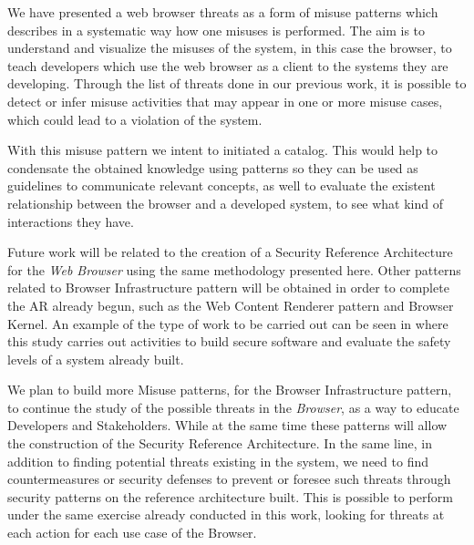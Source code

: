 \documentclass{sig-alternate-05-2015}
\begin{document}


We have presented a web browser threats as a form of misuse patterns which describes in a systematic way how one misuses is performed. The aim is to understand and visualize  the misuses of the system, in this case the browser, to teach developers which use the web browser as a client to the systems they are developing. Through the list of threats done in our previous work, it is possible to detect or infer misuse activities that may appear in one or more misuse cases, which could lead to a violation of the system.

With this misuse pattern we intent to initiated a catalog. This would help to condensate the obtained knowledge using patterns so they can be used as guidelines to communicate relevant concepts, as well to evaluate the existent relationship between the browser and a developed system, to see what kind of interactions they have.

Future work will be related to the creation of a Security Reference Architecture for the \textit{Web Browser} using the same methodology presented here. Other patterns related to Browser Infrastructure pattern will be obtained in order to complete the AR already begun, such as the Web Content Renderer pattern and Browser Kernel. An example of the type of work to be carried out can be seen in \cite{fernandez2014security} where this study carries out activities to build secure software and evaluate the safety levels of a system already built.

We plan to build more Misuse patterns, for the Browser Infrastructure pattern, to continue the study of the possible threats in the \textit{Browser}, as a way to educate Developers and Stakeholders. While at the same time these patterns will allow the construction of the Security Reference Architecture. In the same line, in addition to finding potential threats existing in the system, we need to find countermeasures or security defenses to prevent or foresee such threats through security patterns on the reference architecture built. This is possible to perform under the same exercise already conducted in this work, looking for threats at each action for each use case of the Browser.

  

\end{document}
